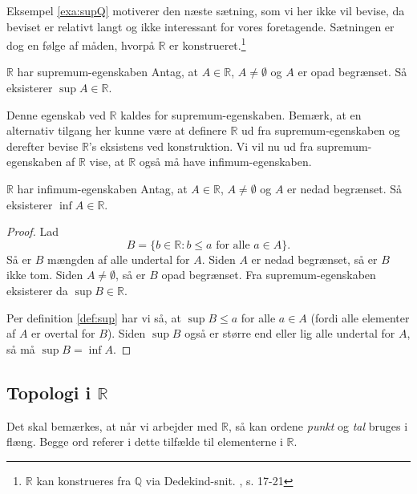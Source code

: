 Eksempel \ref{exa:supQ} motiverer den næste sætning, som vi her ikke vil bevise, da beviset er relativt langt og ikke interessant for vores foretagende.
Sætningen er dog en følge af måden, hvorpå $\mathbb{R}$ er konstrueret.\footnote{$\mathbb{R}$ kan konstrueres fra $\mathbb{Q}$ via Dedekind-snit. \cite{Rudin1976}, s. 17-21}

\begin{theorem}{$\mathbb{R}$ har supremum-egenskaben}{}
  Antag, at $A \in \mathbb{R}$, $A \neq \emptyset$ og $A$ er opad begrænset. 
  Så eksisterer $\sup A \in \mathbb{R}$.
\end{theorem}

Denne egenskab ved $\mathbb{R}$ kaldes for supremum-egenskaben. 
Bemærk, at en alternativ tilgang her kunne være at definere $\mathbb{R}$ ud fra supremum-egenskaben og derefter bevise $\mathbb{R}$'s eksistens ved konstruktion.
Vi vil nu ud fra supremum-egenskaben af $\mathbb{R}$ vise, at $\mathbb{R}$ også må have infimum-egenskaben. 

\begin{theorem}[label=theo:]{$\mathbb{R}$ har infimum-egenskaben  }{}
  Antag, at $A \in \mathbb{R}$, $A \neq \emptyset$ og $A$ er nedad begrænset.
  Så eksisterer $\inf A \in \mathbb{R}$.
\end{theorem}
\begin{proof} 
  Lad 
  \[
  B=\{ b \in \mathbb{R} : b \leq a \text{ for alle } a \in A \}.
  \]  
  Så er $B$ mængden af alle undertal for $A$.
  Siden $A$ er nedad begrænset, så er $B$ ikke tom.
  Siden $A \neq \emptyset$, så er $B$ opad begrænset. 
  Fra supremum-egenskaben eksisterer da $\sup B \in \mathbb{R}$. 

  Per definition \ref{def:sup} har vi så, at $\sup B \leq a$ for alle $a \in A$ (fordi alle elementer af $A$ er overtal for $B$). 
  Siden $\sup B$ også er større end eller lig alle undertal for $A$, så må $\sup B=\inf A$. 
\end{proof}

\subsection{Topologi i $\mathbb{R}$}%
  \label{sub:Topologi i R}
Det skal bemærkes, at når vi arbejder med $\mathbb{R}$, så kan ordene \textit{punkt} og \textit{tal} bruges i flæng.
Begge ord referer i dette tilfælde til elementerne i $\mathbb{R}$.
  
